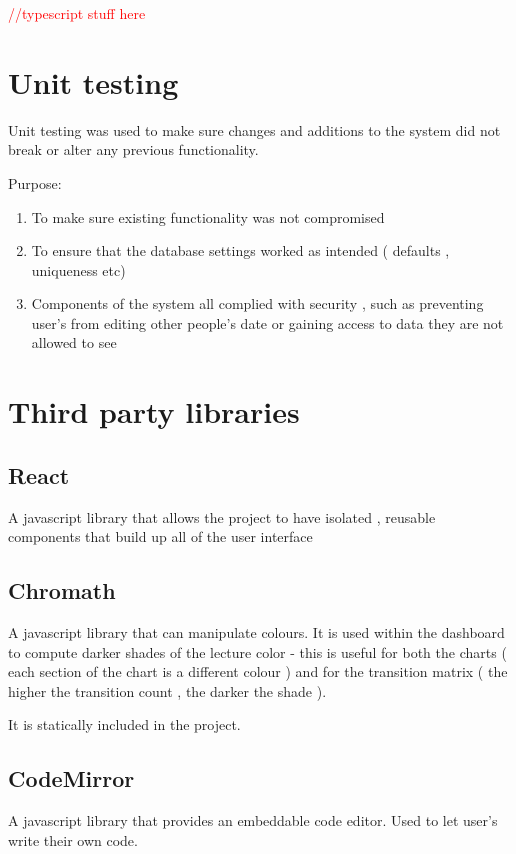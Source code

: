 \textcolor{red}{//typescript stuff here}

\section{Unit testing}
Unit testing was used to make sure changes and additions to the system did not break or alter any previous functionality.

Purpose:
\begin{enumerate}
	\item To make sure existing functionality was not compromised
	\item To ensure that the database settings worked as intended ( defaults , uniqueness etc)
	\item Components of the system all complied with security , such as preventing user's from editing other people's date or gaining access to data they are not allowed to see
\end{enumerate}




\section{Third party libraries} \label{libs}

\subsection{React}
A javascript library that allows the project to have isolated , reusable components that build up all of the user interface

\subsection{Chromath} 
A javascript library that can manipulate colours. It is used within the dashboard to compute darker shades of the lecture color - this is useful for both the charts ( each section of the chart is a different colour ) and for the transition matrix ( the higher the transition count , the darker the shade ).

	It is statically included in the project.
	
\subsection{CodeMirror}
A javascript library that provides an embeddable code editor. Used to let user's write their own code.

